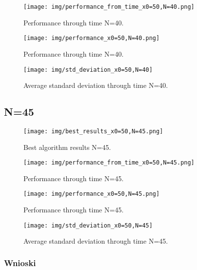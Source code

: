 \documentclass{article}
\begin{document}
\begin{figure}[H]
\centering
\texttt{[image: img/performance\_from\_time\_x0=50,N=40.png]}
\caption{Performance through time N=40.}
\label{fig:label1}
\end{figure}

\begin{figure}[H]
\centering
\texttt{[image: img/performance\_x0=50,N=40.png]}
\caption{Performance through time N=40.}
\label{fig:label1}
\end{figure}

\begin{figure}[H]
\centering
\texttt{[image: img/std\_deviation\_x0=50,N=40]}
\caption{Average standard deviation through time N=40.}
\label{fig:label1}
\end{figure}


\subsection{N=45}
\begin{figure}[H]
\centering
\texttt{[image: img/best\_results\_x0=50,N=45.png]}
\caption{Best algorithm results N=45.}
\label{fig:label1}
\end{figure}

\begin{figure}[H]
\centering
\texttt{[image: img/performance\_from\_time\_x0=50,N=45.png]}
\caption{Performance through time N=45.}
\label{fig:label1}
\end{figure}

\begin{figure}[H]
\centering
\texttt{[image: img/performance\_x0=50,N=45.png]}
\caption{Performance through time N=45.}
\label{fig:label1}
\end{figure}

\begin{figure}[H]
\centering
\texttt{[image: img/std\_deviation\_x0=50,N=45]}
\caption{Average standard deviation through time N=45.}
\label{fig:label1}
\end{figure}


\subsubsection{Wnioski}
\end{document}
